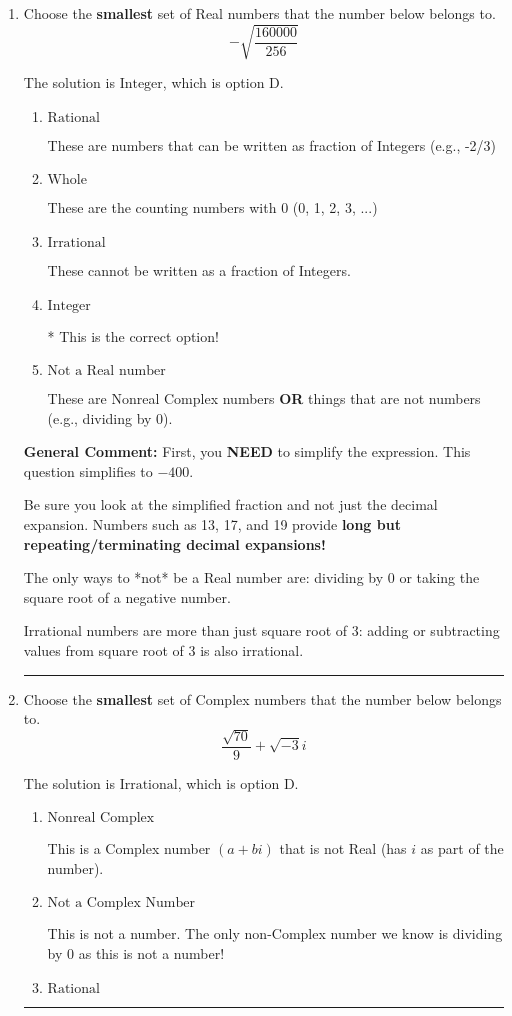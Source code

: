 \documentclass{extbook}[14pt]
\newcommand{\litem}[1]{\item #1

\rule{\textwidth}{0.4pt}}
\begin{document}
\begin{enumerate}\litem{
Choose the \textbf{smallest} set of Real numbers that the number below belongs to.
\[ -\sqrt{\frac{160000}{256}} \]

The solution is \( \text{Integer} \), which is option D.\begin{enumerate}[label=\Alph*.]
\item \( \text{Rational} \)

These are numbers that can be written as fraction of Integers (e.g., -2/3)
\item \( \text{Whole} \)

These are the counting numbers with 0 (0, 1, 2, 3, ...)
\item \( \text{Irrational} \)

These cannot be written as a fraction of Integers.
\item \( \text{Integer} \)

* This is the correct option!
\item \( \text{Not a Real number} \)

These are Nonreal Complex numbers \textbf{OR} things that are not numbers (e.g., dividing by 0).
\end{enumerate}

\textbf{General Comment:} First, you \textbf{NEED} to simplify the expression. This question simplifies to $-400$. 
 
 Be sure you look at the simplified fraction and not just the decimal expansion. Numbers such as 13, 17, and 19 provide \textbf{long but repeating/terminating decimal expansions!} 
 
 The only ways to *not* be a Real number are: dividing by 0 or taking the square root of a negative number. 
 
 Irrational numbers are more than just square root of 3: adding or subtracting values from square root of 3 is also irrational.
}
\litem{
Choose the \textbf{smallest} set of Complex numbers that the number below belongs to.
\[ \frac{\sqrt{70}}{9}+\sqrt{-3}i \]

The solution is \( \text{Irrational} \), which is option D.\begin{enumerate}[label=\Alph*.]
\item \( \text{Nonreal Complex} \)

This is a Complex number $(a+bi)$ that is not Real (has $i$ as part of the number).
\item \( \text{Not a Complex Number} \)

This is not a number. The only non-Complex number we know is dividing by 0 as this is not a number!
\item \( \text{Rational} \)


\end{enumerate}}
\end{enumerate}
\end{document}
